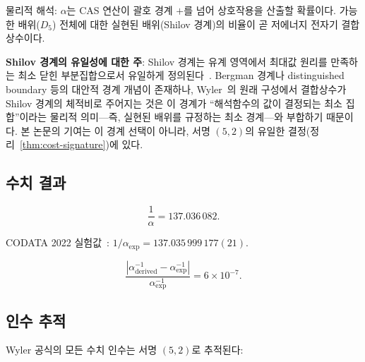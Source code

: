 \documentclass[entropy,article,submit,pdftex,oneauthor]{Definitions/mdpi}
\begin{document}
물리적 해석: $\alpha$는 CAS 연산이 괄호 경계 $+$를 넘어 상호작용을 산출할 확률이다. 가능한 배위($D_5$) 전체에 대한 실현된 배위(Shilov 경계)의 비율이 곧 저에너지 전자기 결합상수이다.

\textbf{Shilov 경계의 유일성에 대한 주}: Shilov 경계는 유계 영역에서 최대값 원리를 만족하는 최소 닫힌 부분집합으로서 유일하게 정의된다~\cite{hua1963}. Bergman 경계나 distinguished boundary 등의 대안적 경계 개념이 존재하나, Wyler~\cite{wyler1969}의 원래 구성에서 결합상수가 Shilov 경계의 체적비로 주어지는 것은 이 경계가 ``해석함수의 값이 결정되는 최소 집합''이라는 물리적 의미---즉, 실현된 배위를 규정하는 최소 경계---와 부합하기 때문이다. 본 논문의 기여는 이 경계 선택이 아니라, 서명 $(5,2)$의 유일한 결정(정리~\ref{thm:cost-signature})에 있다.

\subsection{수치 결과}

\begin{linenomath}
\begin{equation}
\frac{1}{\alpha} = 137.036\,082.
\label{eq:result}
\end{equation}
\end{linenomath}

CODATA 2022 실험값~\cite{codata2022}: $1/\alpha_{\mathrm{exp}} = 137.035\,999\,177(21)$.

\begin{linenomath}
\begin{equation}
\frac{|\alpha^{-1}_{\mathrm{derived}} - \alpha^{-1}_{\mathrm{exp}}|}{\alpha^{-1}_{\mathrm{exp}}} = 6 \times 10^{-7}.
\label{eq:error}
\end{equation}
\end{linenomath}

\subsection{인수 추적}

Wyler 공식의 모든 수치 인수는 서명 $(5,2)$로 추적된다:
\end{document}
